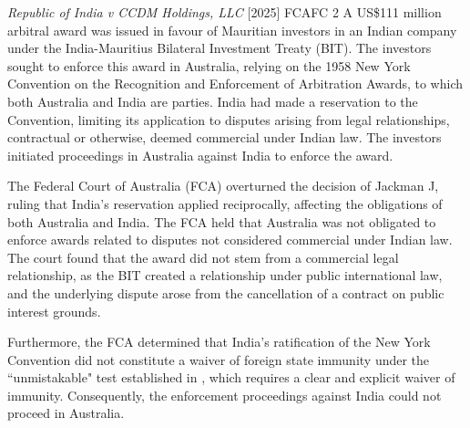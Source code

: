 \begin{casedetails}{\textit{Republic of India v CCDM Holdings, LLC} [2025] FCAFC 2}
    \flushleft
    A US\$111 million arbitral award was issued in favour of Mauritian investors in an Indian company under the India-Mauritius Bilateral Investment Treaty (BIT). The investors sought to enforce this award in Australia, relying on the 1958 New York Convention on the Recognition and Enforcement of Arbitration Awards, to which both Australia and India are parties. India had made a reservation to the Convention, limiting its application to disputes arising from legal relationships, contractual or otherwise, deemed commercial under Indian law. The investors initiated proceedings in Australia against India to enforce the award.
    
    \vspace{\baselineskip}
    
    The Federal Court of Australia (FCA) overturned the decision of Jackman J, ruling that India's reservation applied reciprocally, affecting the obligations of both Australia and India. The FCA held that Australia was not obligated to enforce awards related to disputes not considered commercial under Indian law. The court found that the award did not stem from a commercial legal relationship, as the BIT created a relationship under public international law, and the underlying dispute arose from the cancellation of a contract on public interest grounds.
    
    \vspace{\baselineskip}
    
    Furthermore, the FCA determined that India's ratification of the New York Convention did not constitute a waiver of foreign state immunity under the ``unmistakable" test established in , which requires a clear and explicit waiver of immunity. Consequently, the enforcement proceedings against India could not proceed in Australia.
\end{casedetails}

